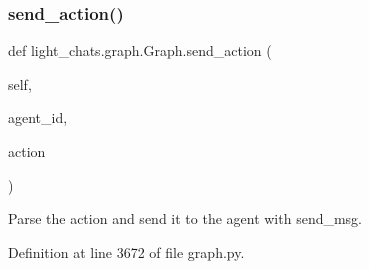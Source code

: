 \subsubsection{\texorpdfstring{send\+\_\+action()}{send\_action()}}
{\footnotesize\ttfamily def light\+\_\+chats.\+graph.\+Graph.\+send\+\_\+action (\begin{DoxyParamCaption}\item[{}]{self,  }\item[{}]{agent\+\_\+id,  }\item[{}]{action }\end{DoxyParamCaption})}

\begin{DoxyVerb}Parse the action and send it to the agent with send_msg.
\end{DoxyVerb}
 

Definition at line 3672 of file graph.\+py.


